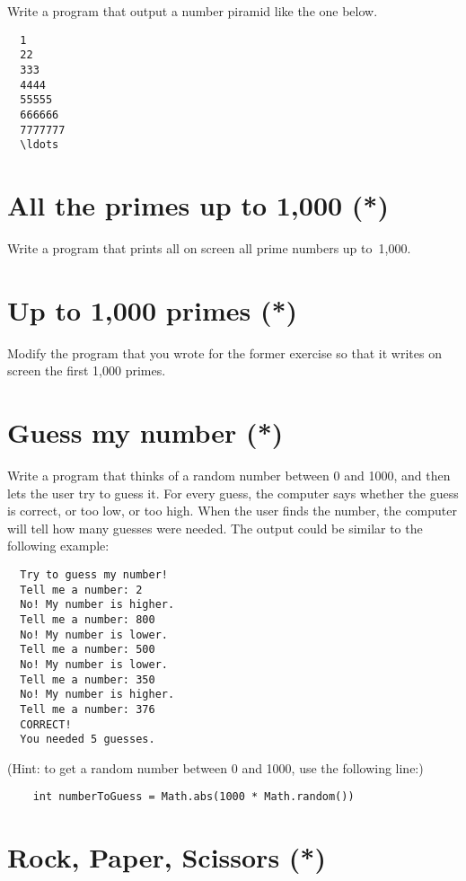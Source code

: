 \documentclass{article}
\begin{document}
Write a program that output a number piramid like the one below. 

\begin{verbatim}
  1
  22
  333
  4444
  55555
  666666
  7777777
  \ldots
\end{verbatim}

\section{All the primes up to 1,000 (*)}
\label{sec:all-primes-up}

Write a program that prints all on screen all prime numbers up
to~1,000. 

\section{Up to 1,000 primes (*)}
\label{sec:all-primes-uprr}

Modify the program that you wrote for the former exercise so that it
writes on screen the first 1,000 primes. 

\section{Guess my number (*)}
\label{sec:guess-my-number}

Write a program that thinks of a random number between 0 and 1000, and
then lets the user try to guess it. For every guess, the computer says
whether the guess is correct, or too low, or too high. When the user
finds the number, the computer will tell how many guesses were
needed. The output could be similar to the following example: 

\begin{verbatim}
  Try to guess my number!
  Tell me a number: 2
  No! My number is higher. 
  Tell me a number: 800
  No! My number is lower.
  Tell me a number: 500
  No! My number is lower.
  Tell me a number: 350
  No! My number is higher.
  Tell me a number: 376
  CORRECT!
  You needed 5 guesses. 
\end{verbatim}

(Hint: to get a random number between 0 and 1000, use the following
line:)

\begin{verbatim}
    int numberToGuess = Math.abs(1000 * Math.random())
\end{verbatim}

\section{Rock, Paper, Scissors (*)}
\label{sec:rock-paper-scissors}
\end{document}
